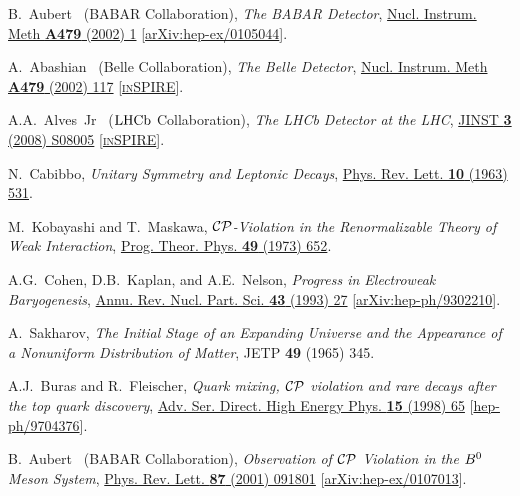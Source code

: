 \documentclass[a4paper,11pt]{article}
\begin{document}
\begin{thebibliography}{99}
B.~Aubert \etal~(BABAR Collaboration),
\textit{The BABAR Detector}, 
\href{https://doi.org/10.1016/S0168-9002(01)02012-5}{Nucl. Instrum. Meth \textbf{A479} (2002) 1} 
[\href{https://arxiv.org/abs/hep-ex/0105044}{arXiv:hep-ex/0105044}].

A.~Abashian \etal~(Belle Collaboration),
\textit{The Belle Detector}, 
\href{https://doi.org/10.1016/S0168-9002(01)02013-7}{Nucl. Instrum. Meth \textbf{A479} (2002) 117} 
[\href{http://inspirehep.net/record/541364}{\textsc{in}SPIRE}].

A.A.~Alves~Jr \etal~($\mathrm{LHCb}$ Collaboration),
\textit{The LHCb Detector at the LHC}, 
\href{https://doi.org/10.1088/1748-0221/3/08/S08005}{JINST \textbf{3} (2008) S08005} 
[\href{http://inspirehep.net/record/796248}{\textsc{in}SPIRE}].

N.~Cabibbo, 
\textit{Unitary Symmetry and Leptonic Decays}, 
\href{https://doi.org/10.1103/PhysRevLett.10.531}{Phys. Rev. Lett. \textbf{10} (1963) 531}.

M.~Kobayashi and T.~Maskawa,
\textit{$\mathcal{CP}$-Violation in the Renormalizable Theory of Weak Interaction},
\href{https://doi.org/10.1143/PTP.49.652}{Prog. Theor. Phys. \textbf{49} (1973) 652}.

A.G.~Cohen, D.B.~Kaplan, and A.E.~Nelson,
\textit{Progress in Electroweak Baryogenesis},
\href{https://doi.org/10.1146/annurev.ns.43.120193.000331}{Annu. Rev. Nucl. Part. Sci. \textbf{43} (1993) 27} 
[\href{https://arxiv.org/abs/hep-ph/9302210}{arXiv:hep-ph/9302210}].

A.~Sakharov,
\textit{The Initial Stage of an Expanding Universe and the Appearance of 
a Nonuniform Distribution of Matter},
JETP \textbf{49} (1965) 345.

A.J.~Buras and R.~Fleischer, 
\textit{Quark mixing, $\mathcal{CP}$ violation and rare decays after the top quark discovery},
\href{https://doi.org/10.1142/9789812812667_0002}{Adv. Ser. Direct. High Energy Phys. \textbf{15} (1998) 65} 
[\href{https://arxiv.org/abs/hep-ph/9704376}{hep-ph/9704376}].

B.~Aubert \etal~(BABAR Collaboration),
\textit{Observation of $\mathcal{CP}$ Violation in the $B^0$ Meson System}, 
\href{https://doi.org/10.1103/PhysRevLett.87.091801}{Phys. Rev. Lett. \textbf{87} (2001) 091801}
[\href{https://arxiv.org/abs/hep-ex/0107013}{arXiv:hep-ex/0107013}].


\end{thebibliography}
\end{document}
